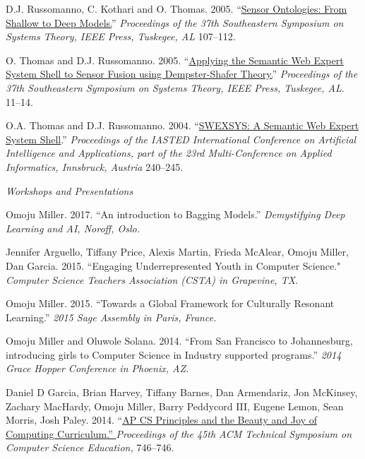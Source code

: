\documentclass[11pt,article,oneside]{memoir}
\begin{document}
\ind D.J. Russomanno, C. Kothari and O. Thomas. 2005. ``\href{http://scholar.google.com/citations?view_op=view_citation&hl=en&user=E7z_wrwAAAAJ&citation_for_view=E7z_wrwAAAAJ:u-x6o8ySG0sC}{Sensor Ontologies: From Shallow to Deep Models.}'' \emph{Proceedings of the 37th Southeastern Symposium on Systems Theory, IEEE Press, Tuskegee, AL} 107--112.

\ind O. Thomas and D.J. Russomanno. 2005. ``\href{http://scholar.google.com/citations?view_op=view_citation&hl=en&user=E7z_wrwAAAAJ&citation_for_view=E7z_wrwAAAAJ:d1gkVwhDpl0C}{Applying the Semantic Web Expert System Shell to Sensor Fusion using Dempster-Shafer Theory.}'' \emph{Proceedings of the 37th Southeastern Symposium on Systems Theory, IEEE Press, Tuskegee, AL}. 11--14.

\ind O.A. Thomas and D.J. Russomanno. 2004. ``\href{http://scholar.google.com/citations?view_op=view_citation&hl=en&user=E7z_wrwAAAAJ&citation_for_view=E7z_wrwAAAAJ:2osOgNQ5qMEC}{SWEXSYS: A Semantic Web Expert System Shell}.'' \emph{Proceedings of the IASTED International Conference on Artificial Intelligence and Applications, part of the 23rd Multi-Conference on Applied Informatics, Innsbruck, Austria} 240--245.

\bigskip

\noindent\emph{Workshops and Presentations  \vspace{0.05in}}


\ind Omoju Miller. 2017. ``An introduction to Bagging Models.'' \emph{Demystifying Deep Learning and AI, Noroff, Oslo.}

\ind Jennifer Arguello, Tiffany Price, Alexis Martin, Frieda McAlear, Omoju Miller, Dan Garcia. 2015. ``Engaging Underrepresented Youth in Computer Science."  \emph{Computer Science Teachers Association (CSTA) in Grapevine, TX.}

\ind Omoju Miller. 2015. ``Towards a Global Framework for Culturally Resonant Learning.'' \emph{2015 Sage Assembly in Paris, France.}

\ind Omoju Miller and Oluwole Solana. 2014. ``From San Francisco to Johannesburg, introducing girls to Computer Science in Industry supported programs.'' \emph{2014 Grace Hopper Conference in Phoenix, AZ.}

\ind Daniel D Garcia, Brian Harvey, Tiffany Barnes, Dan Armendariz, Jon McKinsey, Zachary MacHardy, Omoju Miller, Barry Peddycord III, Eugene Lemon, Sean Morris, Josh Paley. 2014. ``\href{http://dl.acm.org/citation.cfm?id=2539026}{AP CS Principles and the Beauty and Joy of Computing Curriculum.'' }\emph{Proceedings of the 45th ACM Technical Symposium on Computer Science Education,} 746--746.
\end{document}
